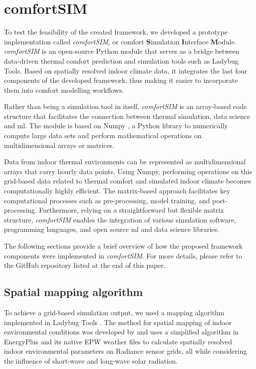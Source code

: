 

\section{comfortSIM}

To test the feasibility of the created framework, we developed a prototype implementation called \textit{comfortSIM}, or comfort \textbf{S}imulation \textbf{I}nterface \textbf{M}odule. \textit{comfortSIM} is an open-source Python module that serves as a bridge between data-driven thermal comfort prediction and simulation tools such as Ladybug Tools. Based on spatially resolved indoor climate data, it integrates the last four components of the developed framework, thus making it easier to incorporate them into comfort modelling workflows. 

Rather than being a simulation tool in itself, \textit{comfortSIM} is an array-based code structure that facilitates the connection between thermal simulation, data science and \gls{ml}. The module is based on Numpy \citep{vanderWaltNumpy2011}, a Python library to numerically compute large data sets and perform mathematical operations on multidimensional arrays or matrices. 

Data from indoor thermal environments can be represented as multidimensional arrays that carry hourly data points. Using Numpy, performing operations on this grid-based data related to thermal comfort and simulated indoor climate becomes computationally highly efficient. The matrix-based approach facilitates key computational processes such as pre-processing, model training, and post-processing. Furthermore, relying on a straightforward but flexible matrix structure, \textit{comfortSIM} enables the integration of various simulation software, programming languages, and open source \gls{ml} and data science libraries. 

The following sections provide a brief overview of how the proposed framework components were implemented in \textit{comfortSIM}. For more details, please refer to the GitHub repository listed at the end of this paper.



\subsection{Spatial mapping algorithm}

To achieve a grid-based simulation output, we used a mapping algorithm implemented in Ladybug Tools \citep{SadeghipourRoudsariLadybug2013}. The method for spatial mapping of indoor environmental conditions was developed by \citet{Mackey2015} and uses a simplified algorithm in EnergyPlus and its native EPW weather files \citep{CrawleyEnergyPlus2001} to calculate spatially resolved indoor environmental parameters on Radiance sensor grids, all while considering the influence of short-wave and long-wave solar radiation. 


